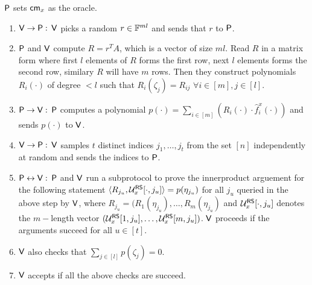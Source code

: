 $\mathsf{P}$ sets $\mathsf{cm}_x$ as the oracle.
\begin{enumerate}
	\item $\mathsf{V} \rightarrow \mathsf{P}: $ $\mathsf{V}$ picks a random $r\in \mathbb{F}^{ml}$ and sends that $r$ to $\mathsf{P}$.
	
	\item $\mathsf{P}$ and $\mathsf{V}$ compute $R=r^TA$, which is a vector of size $ml$. Read $R$ in a matrix form where first $l$ elements of $R$ forms the first row, next $l$ elements forms the second row, similary $R$ will have $m$ rows. Then they construct polynomials $R_i(\cdot)$ of degree $<l$ such that $R_i(\zeta_j)=R_{ij}$ $\forall i\in [m], j\in [l]$. 
	
	\item $\mathsf{P} \rightarrow \mathsf{V}: $  $\mathsf{P}$ computes a polynomial $p(\cdot)=\sum_{i\in[m]} ( R_i(\cdot)\cdot \hat{f}^x_i(\cdot))$ and sends $p(\cdot)$ to $\mathsf{V}$.
	
	\item $\mathsf{V} \rightarrow \mathsf{P}: $ $\mathsf{V}$ samples $t$ distinct  indices $j_1,\ldots,j_t$ from the set $[n]$ independently at random and sends the indices to $\mathsf{P}$.
	
	\item $\mathsf{P} \leftrightarrow \mathsf{V}: $ $\mathsf{P}$ and $\mathsf{V}$ run a subprotocol to prove the innerproduct arguement for the following statement $\langle R_{j_u},\mathcal{U}^{\mathsf{RS}}_x[\cdot,j_u]\rangle = p(\eta_{j_u})$ for all $j_u$ queried in the above step by $\mathsf{V}$, where $R_{j_u}=(R_1(\eta_{j_u}),\ldots,R_m(\eta_{j_u})$ and $\mathcal{U}^{\mathsf{RS}}_x[\cdot,j_u]$ denotes the $m-$length vector $(\mathcal{U}^{\mathsf{RS}}_x[1,j_u],\ldots, \mathcal{U}^{\mathsf{RS}}_x[m,j_u])$. $\mathsf{V}$ proceeds if the arguments succeed for all $u \in [t]$.
	
	\item $\mathsf{V}$ also checks that $\sum_{j\in[l]} p(\zeta_j)=0$.
	
	\item $\mathsf{V}$ accepts if all the above checks are succeed.	  
\end{enumerate}

